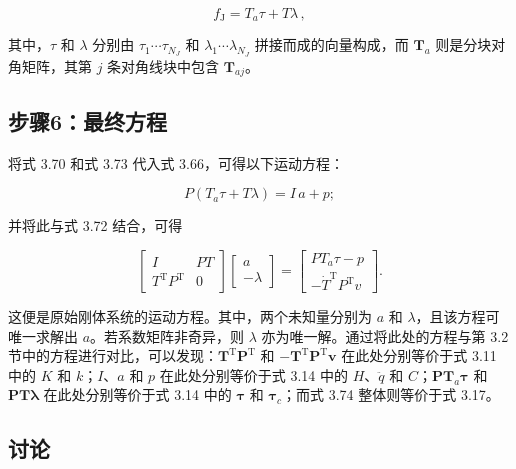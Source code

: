 \documentclass[10pt,a4paper]{book}
\theoremstyle{thmstyle} %
\theoremstyle{defstyle} %
\theoremstyle{prostyle} %
\begin{document}
$$
f _ { \mathrm { J } } = T _ { a } \tau + T \lambda \, ,
$$



其中，$\tau$ 和 $\lambda$ 分别由 $\tau_{1} \cdots \tau_{N_{J}}$ 和 $\lambda_{1} \cdots \lambda_{N_{J}}$ 拼接而成的向量构成，而 $\mathbf{T}_{a}$ 则是分块对角矩阵，其第 $j$ 条对角线块中包含 $\mathbf{T}_{aj}$。



\subsection{步骤6：最终方程}





将式 3.70 和式 3.73 代入式 3.66，可得以下运动方程：



$$
P ( T _ { a } \tau + T \lambda ) = I \, a + p ;
$$



并将此与式 3.72 结合，可得



$$
\left[ \begin{array}{ll} { I } & { P T } \\{ T ^{\mathrm { T} } P ^{\mathrm { T} } } & { 0 } \end{array} \right] \left[ \begin{array}{l} { a } \\{ - \lambda } \end{array} \right] = \left[ \begin{array}{l} { P T _ { a } \tau - p } \\{ - \dot { T } ^{\mathrm { T} } P ^{\mathrm { T} } v } \end{array} \right] .
$$



这便是原始刚体系统的运动方程。其中，两个未知量分别为 $a$ 和 $\lambda$，且该方程可唯一求解出 $a$。若系数矩阵非奇异，则 $\lambda$ 亦为唯一解。通过将此处的方程与第 3.2 节中的方程进行对比，可以发现：$\mathbf{T}^{\mathrm{T}}\mathbf{P}^{\mathrm{T}}$ 和 $- \mathbf{T}^{\mathrm{T}}\mathbf{P}^{\mathrm{T}}\mathbf{v}$ 在此处分别等价于式 3.11 中的 $K$ 和 $k$；$I$、$a$ 和 $p$ 在此处分别等价于式 3.14 中的 $H$、$\ddot{q}$ 和 $C$；$\mathbf{P}\mathbf{T}_{a}\boldsymbol{\tau}$ 和 $\mathbf{P}\mathbf{T}\boldsymbol{\lambda}$ 在此处分别等价于式 3.14 中的 $\boldsymbol{\tau}$ 和 $\boldsymbol{\tau}_{c}$；而式 3.74 整体则等价于式 3.17。



\subsection{讨论}
\end{document}

